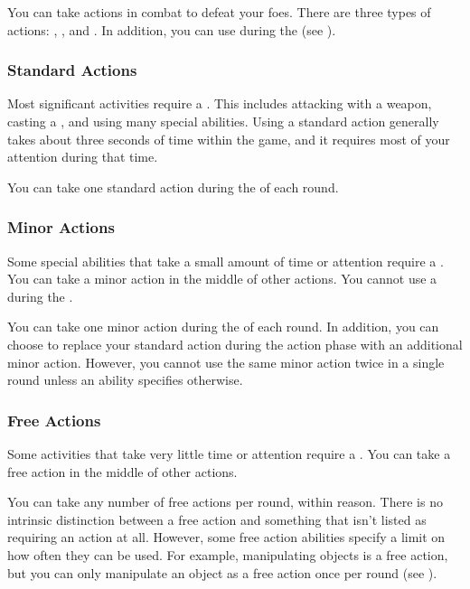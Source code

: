     You can take actions in combat to defeat your foes.
    There are three types of actions: , , and .
    In addition, you can use  during the  (see ).

    \subsubsection{Standard Actions}\label{Standard Actions}
      Most significant activities require a .
      This includes attacking with a weapon, casting a , and using many special abilities.
      Using a standard action generally takes about three seconds of time within the game, and it requires most of your attention during that time.

      You can take one standard action during the  of each round.

    \subsubsection{Minor Actions}\label{Minor Actions}
      Some special abilities that take a small amount of time or attention require a .
      You can take a minor action in the middle of other actions.
      You cannot use a  during the .

      You can take one minor action during the  of each round.
      In addition, you can choose to replace your standard action during the action phase with an additional minor action.
      However, you cannot use the same minor action twice in a single round unless an ability specifies otherwise.

    \subsubsection{Free Actions}\label{Free Actions}
      Some activities that take very little time or attention require a .
      You can take a free action in the middle of other actions.

      You can take any number of free actions per round, within reason.
      There is no intrinsic distinction between a free action and something that isn't listed as requiring an action at all.
      However, some free action abilities specify a limit on how often they can be used.
      For example, manipulating objects is a free action, but you can only manipulate an object as a free action once per round (see ).

